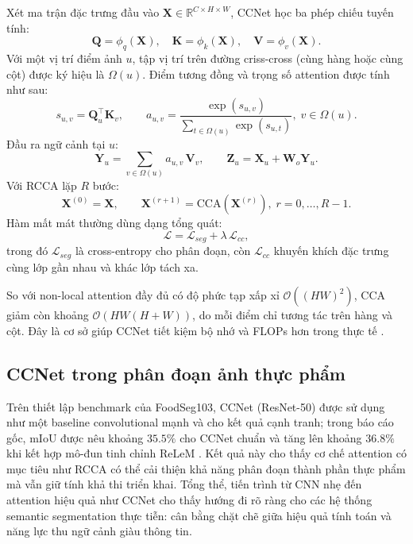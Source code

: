Xét ma trận đặc trưng đầu vào $\mathbf{X}\in\mathbb{R}^{C\times H\times W}$, CCNet học ba phép chiếu tuyến tính:
\[
\mathbf{Q}=\phi_q(\mathbf{X}),\quad
\mathbf{K}=\phi_k(\mathbf{X}),\quad
\mathbf{V}=\phi_v(\mathbf{X}).
\]
Với một vị trí điểm ảnh $u$, tập vị trí trên đường criss-cross (cùng hàng hoặc cùng cột) được ký hiệu là $\Omega(u)$. Điểm tương đồng và trọng số attention được tính như sau:
\[
s_{u,v}=\mathbf{Q}_u^\top\mathbf{K}_v,\qquad
a_{u,v}=\frac{\exp(s_{u,v})}{\sum_{t\in\Omega(u)}\exp(s_{u,t})},\; v\in\Omega(u).
\]
Đầu ra ngữ cảnh tại $u$:
\[
\mathbf{Y}_u=\sum_{v\in\Omega(u)} a_{u,v}\,\mathbf{V}_v,
\qquad
\mathbf{Z}_u=\mathbf{X}_u+\mathbf{W}_o\mathbf{Y}_u.
\]
Với RCCA lặp $R$ bước:
\[
\mathbf{X}^{(0)}=\mathbf{X},\qquad
\mathbf{X}^{(r+1)}=\mathrm{CCA}(\mathbf{X}^{(r)}),\; r=0,\ldots,R-1.
\]
Hàm mất mát thường dùng dạng tổng quát:
\[
\mathcal{L}=\mathcal{L}_{seg}+\lambda\,\mathcal{L}_{cc},
\]
trong đó $\mathcal{L}_{seg}$ là cross-entropy cho phân đoạn, còn $\mathcal{L}_{cc}$ khuyến khích đặc trưng cùng lớp gần nhau và khác lớp tách xa.

So với non-local attention đầy đủ có độ phức tạp xấp xỉ $\mathcal{O}((HW)^2)$, CCA giảm còn khoảng $\mathcal{O}(HW(H+W))$, do mỗi điểm chỉ tương tác trên hàng và cột. Đây là cơ sở giúp CCNet tiết kiệm bộ nhớ và FLOPs hơn trong thực tế \cite{ccnet}.

\subsection{CCNet trong phân đoạn ảnh thực phẩm}

Trên thiết lập benchmark của FoodSeg103, CCNet (ResNet-50) được sử dụng như một baseline convolutional mạnh và cho kết quả cạnh tranh; trong báo cáo gốc, mIoU được nêu khoảng $35.5\%$ cho CCNet chuẩn và tăng lên khoảng $36.8\%$ khi kết hợp mô-đun tinh chỉnh ReLeM \cite{benchmarkfood}. Kết quả này cho thấy cơ chế attention có mục tiêu như RCCA có thể cải thiện khả năng phân đoạn thành phần thực phẩm mà vẫn giữ tính khả thi triển khai. Tổng thể, tiến trình từ CNN nhẹ đến attention hiệu quả như CCNet cho thấy hướng đi rõ ràng cho các hệ thống semantic segmentation thực tiễn: cân bằng chặt chẽ giữa hiệu quả tính toán và năng lực thu ngữ cảnh giàu thông tin.

